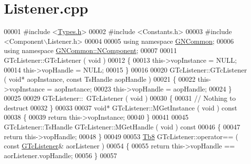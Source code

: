 \hypertarget{_listener_8cpp_source}{}\section{Listener.\+cpp}
\label{_listener_8cpp_source}

\begin{DoxyCode}
00001 \textcolor{preprocessor}{#include <\mbox{\hyperlink{_types_8h}{Types.h}}>}
00002 \textcolor{preprocessor}{#include <Constants.h>}
00003 \textcolor{preprocessor}{#include <Component\(\backslash\)Listener.h>}
00004 
00005 \textcolor{keyword}{using namespace }\mbox{\hyperlink{namespace_g_n_common}{GNCommon}};
00006 \textcolor{keyword}{using namespace }\mbox{\hyperlink{namespace_g_n_common_1_1_n_component}{GNCommon::NComponent}};
00007 
00011 GTcListener::GTcListener ( \textcolor{keywordtype}{void} )
00012 \{
00013    this->vopInstance = NULL;
00014    this->vopHandle   = NULL;
00015 \}
00016 
00020 GTcListener::GTcListener ( \textcolor{keywordtype}{void}* aopInstance, \textcolor{keyword}{const} TsHandle aopHandle )
00021 \{
00022    this->vopInstance = aopInstance;
00023    this->vopHandle   = aopHandle;
00024 \}
00025 
00029 GTcListener::~GTcListener ( \textcolor{keywordtype}{void} )
00030 \{
00031    \textcolor{comment}{// Nothing to destruct}
00032 \}
00033 
00037 \textcolor{keywordtype}{void}* GTcListener::MGetInstance ( \textcolor{keywordtype}{void} )\textcolor{keyword}{ const}
00038 \textcolor{keyword}{}\{
00039    \textcolor{keywordflow}{return} this->vopInstance;
00040 \}
00041 
00045 GTcListener::TsHandle GTcListener::MGetHandle ( \textcolor{keywordtype}{void} )\textcolor{keyword}{ const}
00046 \textcolor{keyword}{}\{
00047    \textcolor{keywordflow}{return} this->vopHandle;
00048 \}
00049 
00053 \mbox{\hyperlink{namespace_g_n_common_a8115dc7ed53b6e5b52e6bfde1632ea74}{Tb8}} GTcListener::operator== ( \textcolor{keyword}{const} \mbox{\hyperlink{class_g_n_common_1_1_n_component_1_1_g_tc_listener}{GTcListener}}& aorListener )
00054 \{
00055    \textcolor{keywordflow}{return} this->vopHandle == aorListener.vopHandle;
00056 \}
00057 
\end{DoxyCode}
